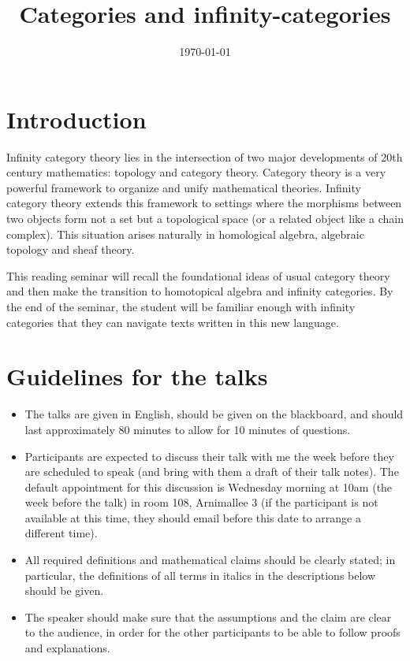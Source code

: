 \documentclass{amsart}
\date{\today}
\title{Categories and infinity-categories}
\theoremstyle{definition}
\theoremstyle{remark}
\begin{document}
\maketitle

\section*{Introduction}

Infinity category theory lies in the intersection of two major developments of 20th century mathematics: topology and category theory. Category theory is a very powerful framework to organize and unify mathematical theories. Infinity category theory extends this framework to settings where the morphisms between two objects form not a set but a topological space (or a related object like a chain complex). This situation arises naturally in homological algebra, algebraic topology and sheaf theory. 

This reading seminar will recall the foundational ideas of usual category theory and then make the transition to homotopical algebra and infinity categories. By the end of the seminar, the student will be familiar enough with infinity categories that they can navigate texts written in this new language.

\section*{Guidelines for the talks}

\begin{itemize}
\item The talks are given in English, should be given on the blackboard, and should last approximately 80 minutes to
allow for 10 minutes of questions.
\item Participants are expected to discuss their talk with me the week before they are scheduled to
speak (and bring with them a draft of their talk notes). The default appointment for this
discussion is Wednesday morning at 10am (the week before the talk) in room 108, Arnimallee 3 (if the participant
is not available at this time, they should email before this date to arrange a different time).
\item All required definitions and mathematical claims should be clearly stated; in particular, the
  definitions of all terms in italics in the descriptions below should be given.
\item The speaker should make sure that the assumptions and the claim are clear to the audience, in order for the
other participants to be able to follow proofs and explanations.
\end{itemize}
\end{document}
